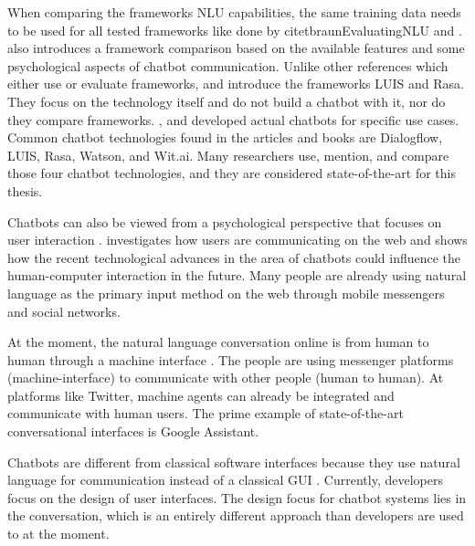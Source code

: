 When comparing the frameworks NLU capabilities, the same training data needs to be used for all tested frameworks like done by citet{braunEvaluatingNLU} and \citet{gregori2017evaluation}.
\citet{dutta2017developing} also introduces a framework comparison based on the available features and some psychological aspects of chatbot communication.
Unlike other references which either use or evaluate frameworks, \citet{luis2015williams} and \citet{rasabocklisch2017} 
introduce the frameworks LUIS\cite{luis2015williams} and Rasa\cite{rasabocklisch2017}. 
They focus on the technology itself and do not build a chatbot with it, nor do they compare frameworks.
\citet{dutta2017developing, pharmacybot}, and \citet{PRZEGALINSKA2019785} developed actual chatbots for specific use cases.
Common chatbot technologies found in the articles and books are Dialogflow, LUIS,  Rasa, Watson, and Wit.ai.
Many researchers use, mention, and compare those four chatbot technologies, and they are considered state-of-the-art for this thesis.

Chatbots can also be viewed from a psychological perspective that focuses on user interaction \citet{folstad2017chatbots}.
\citet{folstad2017chatbots} investigates how users are communicating on the web and shows how the recent technological advances in the area of chatbots could influence the human-computer interaction in the future.
Many people are already using natural language as the primary input method on the web through mobile messengers and social networks. 

At the moment, the natural language conversation online is from human to human through a machine interface \cite{folstad2017chatbots}.
The people are using messenger platforms (machine-interface) to communicate with other people (human to human).
At platforms like Twitter, machine agents can already be integrated and communicate with human users.
The prime example of state-of-the-art conversational interfaces is Google Assistant.
 
Chatbots are different from classical software interfaces because they use natural language for communication instead of a classical GUI \cite{folstad2017chatbots}.
Currently, developers focus on the design of user interfaces.
The design focus for chatbot systems lies in the conversation, which is an entirely different approach than developers are used to at the moment.

